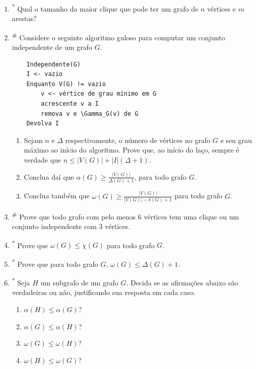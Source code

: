 \begin{enumerate}[label=\textbf{\arabic*.}, ref=\arabic*, resume]
    \item\textsuperscript{*} Qual o tamanho da maior clique que pode ter um grafo de $n$ vértices e $m$ arestas? 
    
    \item\textsuperscript{\#} Considere o seguinte algoritmo guloso para computar um conjunto independente de um grafo $G$. 
    \begin{verbatim}
    Independente(G)
    I <- vazio
    Enquanto V(G) != vazio
        v <- vértice de grau mínimo em G
        acrescente v a I
        remova v e \Gamma_G(v) de G
    Devolva I
    \end{verbatim} 
    \begin{enumerate}
        \item Sejam $n$ e $\Delta$ respectivamente, o número de vértices no grafo $G$ e seu grau máximo ao início do algoritmo. Prove que, ao início do laço, sempre é verdade que $n\le|V(G)|+|I|(\Delta+1)$. 
        \item Conclua daí que $\alpha(G)\ge\frac{|V(G)|}{\Delta(G)+1}$, para todo grafo $G$. 
        \item Conclua também que $\omega(G)\ge\frac{|V(G)|}{|V(G)|-\delta(G)+1}$ para todo grafo $G$. 
        
    \end{enumerate}
    
    \item\textsuperscript{\#} Prove que todo grafo com pelo menos 6 vértices tem uma clique ou um conjunto independente com 3 vértices. 
    
    \item\textsuperscript{*} Prove que $\omega(G)\le\chi(G)$ para todo grafo $G$. 
    
    \item\textsuperscript{*} Prove que para todo grafo $G$, $\omega(G)\le\Delta(G)+1$. 
    
    \item\textsuperscript{*} Seja $H$ um subgrafo de um grafo $G$. Decida se as afirmações abaixo são verdadeiras ou não, justificando sua resposta em cada caso. 
    \begin{enumerate}
        \item $\alpha(H)\le\alpha(G)$? 
        \item $\alpha(G)\le\alpha(H)$? 
        \item $\omega(G)\le\omega(H)$? 
        \item $\omega(H)\le\omega(G)$?
    \end{enumerate}
    

\end{enumerate}
